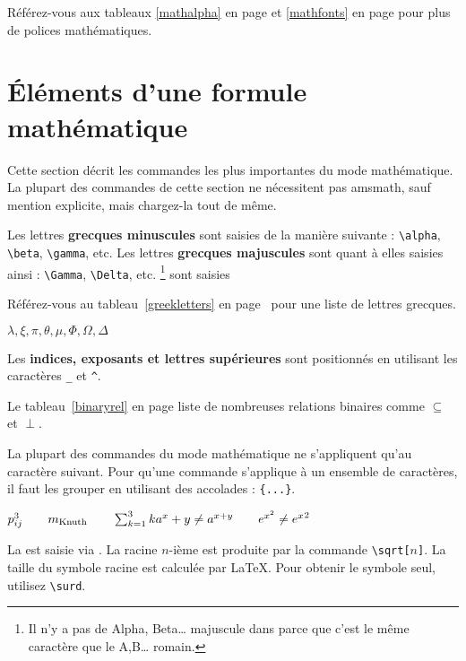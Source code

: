 Référez-vous aux tableaux \ref{mathalpha} en page \pageref{mathalpha}
et \ref{mathfonts} en page \pageref{mathfonts} pour plus de polices
mathématiques.


\section{Éléments d'une formule mathématique}


Cette section décrit les commandes les plus importantes
du mode mathématique. La plupart des commandes de cette section ne
nécessitent pas \textsf{amsmath}, sauf mention explicite, mais
chargez-la tout de même.


Les lettres \textbf{grecques minuscules} sont saisies de la manière
suivante :
\verb|\alpha|, \verb|\beta|, \verb|\gamma|, etc. Les lettres
\textbf{grecques majuscules} sont quant à elles saisies ainsi :
\verb|\Gamma|, \verb|\Delta|, etc.
\footnote{Il n'y a pas de Alpha, Beta\ldots{} majuscule dans \LaTeXe{}
parce que c'est le même caractère que le A,B\ldots{} romain.} sont saisies

Référez-vous au tableau~\ref{greekletters} en
page~\pageref{greekletters} pour une liste de lettres grecques.
\begin{example}
$\lambda,\xi,\pi,\theta,
 \mu,\Phi,\Omega,\Delta$
\end{example}


Les \textbf{indices, exposants et lettres supérieures}
sont
positionnés en utilisant les caractères
\verb|_| et \verb|^|.

Le tableau~\ref{binaryrel} en page \pageref{binaryrel}  liste de
nombreuses relations binaires comme $\subseteq$ et $\perp$.

La plupart des commandes du mode mathématique ne s'appliquent qu'au
caractère suivant. Pour qu'une commande s'applique à un ensemble de
caractères, il faut les grouper en utilisant des accolades :
\verb|{...}|.

\begin{example}
$p^3_{ij} \qquad
 m_\text{Knuth}\qquad
\sum_{k=1}^3 k \\[5pt]
 a^x+y \neq a^{x+y}\qquad
 e^{x^2} \neq {e^x}^2$
\end{example}

La \textbf{} est saisie via . La
racine $n$-ième est produite par la commande
\verb|\sqrt[|$n$\verb|]|. La taille du symbole racine est calculée par
\LaTeX. Pour obtenir le symbole seul, utilisez \verb|\surd|.


